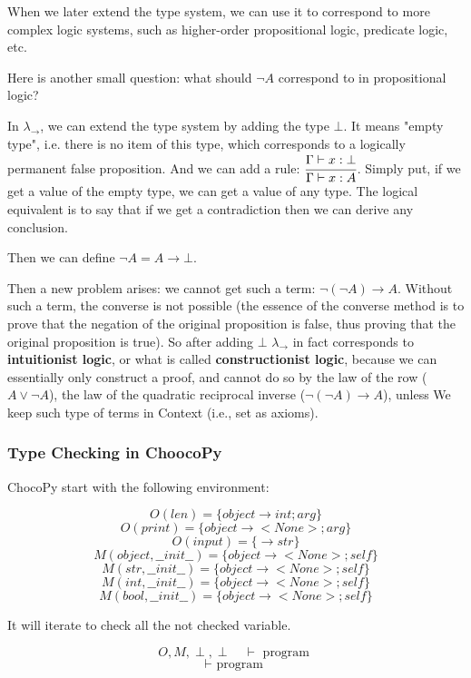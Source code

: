 \documentclass[a4paper]{exam}
\begin{document}
When we later extend the type system, we can use it to correspond to more complex logic systems, such as higher-order propositional logic, predicate logic, etc.

Here is another small question: what should $\lnot A$ correspond to in propositional logic?

In $\lambda_\to$, we can extend the type system by adding the type $\bot$. It means "empty type", i.e. there is no item of this type, which corresponds to a logically permanent false proposition. And we can add a rule: $\cfrac{\Gamma\vdash x:\bot}{\Gamma\vdash x:A}$. Simply put, if we get a value of the empty type, we can get a value of any type. The logical equivalent is to say that if we get a contradiction then we can derive any conclusion.

Then we can define $\lnot A=A\to\bot$.

Then a new problem arises: we cannot get such a term: $\lnot(\lnot A)\to A$. Without such a term, the converse is not possible (the essence of the converse method is to prove that the negation of the original proposition is false, thus proving that the original proposition is true). So after adding $\bot$ $\lambda_\to$ in fact corresponds to \textbf{intuitionist logic}, or what is called \textbf{constructionist logic}, because we can essentially only construct a proof, and cannot do so by the law of the row ($A\lor\lnot A$), the law of the quadratic reciprocal inverse ($\lnot(\lnot A)\to A$), unless We keep such type of terms in Context (i.e., set as axioms).

\subsubsection{Type Checking in ChoocoPy \cite{cs164chocopy}}
ChocoPy start with the following environment:

$$O( len )=\{ object \rightarrow int ; arg \}$$
$$O( print )=\{ object \rightarrow< None >; arg \}$$
$$O( input )=\{\rightarrow str \}$$
$$M( object,\_\_init\_\_ )=\{ object \rightarrow< None >; self \}$$
$$M( str,\_\_init\_\_ )=\{ object \rightarrow< None >; self \}$$
$$M( int,\_\_init\_\_ )=\{ object \rightarrow< None >; self \}$$
$$M( bool,\_\_init\_\_ )=\{ object \rightarrow< None >; self \}$$

It will iterate to check all the not checked variable.

$$O, M, \perp, \perp\quad \vdash \text { program }$$
\hline $$  \vdash \text { program }$$
\end{document}

